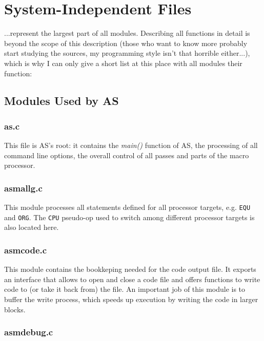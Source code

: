 \documentclass[12pt,twoside]{report}
\newcommand{\tty}[1]{{\tt #1}}
\begin{document}

\section{System-Independent Files}

...represent the largest part of all modules.  Describing all functions in
detail is beyond the scope of this description (those who want to know
more probably start studying the sources, my programming style isn't that
horrible either...), which is why I can only give a short list at this
place with all modules their function:

\subsection{Modules Used by AS}

\subsubsection{as.c}

This file is AS's root: it contains the {\em main()} function of AS, the
processing of all command line options, the overall control of all passes
and parts of the macro processor.

\subsubsection{asmallg.c}

This module processes all statements defined for all processor targets,
e.g. \tty{EQU} and \tty{ORG}.  The \tty{CPU} pseudo-op used to switch
among different processor targets is also located here.

\subsubsection{asmcode.c}

This module contains the bookkeping needed for the code output file.  It
exports an interface that allows to open and close a code file and offers
functions to write code to (or take it back from) the file.  An important
job of this module is to buffer the write process, which speeds up
execution by writing the code in larger blocks.

\subsubsection{asmdebug.c}
\end{document}

